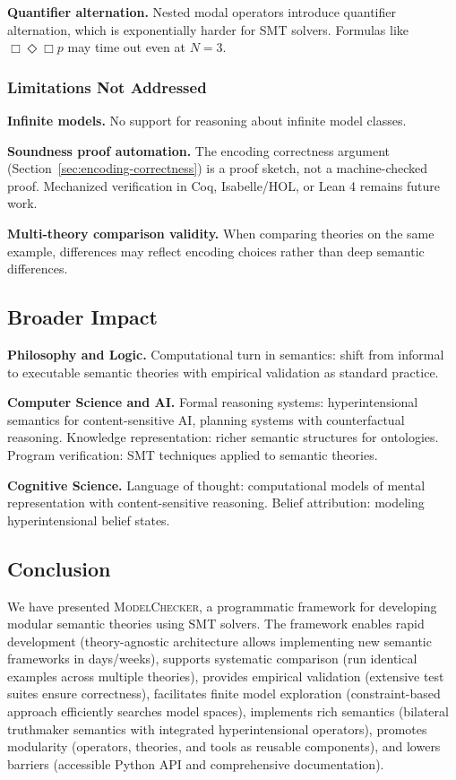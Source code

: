 \documentclass[pdflatex,sn-mathphys-num]{sn-jnl}
\newcommand{\nec}{\Box}                     %
\newcommand{\poss}{\Diamond}                %
\newcommand{\modelchecker}{\textsc{ModelChecker}}
\theoremstyle{thmstyleone}
\theoremstyle{thmstyletwo}
\theoremstyle{thmstylethree}
\begin{document}
\textbf{Quantifier alternation.}
Nested modal operators introduce quantifier alternation, which is exponentially harder for SMT solvers.
Formulas like $\nec\poss\nec p$ may time out even at $N=3$.

\subsubsection{Limitations Not Addressed}

\textbf{Infinite models.}
No support for reasoning about infinite model classes.

\textbf{Soundness proof automation.}
The encoding correctness argument (Section~\ref{sec:encoding-correctness}) is a proof sketch, not a machine-checked proof.
Mechanized verification in Coq, Isabelle/HOL, or Lean 4 remains future work.

\textbf{Multi-theory comparison validity.}
When comparing theories on the same example, differences may reflect encoding choices rather than deep semantic differences.

\subsection{Broader Impact}\label{sec:impact}

\textbf{Philosophy and Logic.}
Computational turn in semantics: shift from informal to executable semantic theories with empirical validation as standard practice.

\textbf{Computer Science and AI.}
Formal reasoning systems: hyperintensional semantics for content-sensitive AI, planning systems with counterfactual reasoning.
Knowledge representation: richer semantic structures for ontologies.
Program verification: SMT techniques applied to semantic theories.

\textbf{Cognitive Science.}
Language of thought: computational models of mental representation with content-sensitive reasoning.
Belief attribution: modeling hyperintensional belief states.

\subsection{Conclusion}\label{sec:conclusion}

We have presented \modelchecker{}, a programmatic framework for developing modular semantic theories using SMT solvers.
The framework enables rapid development (theory-agnostic architecture allows implementing new semantic frameworks in days/weeks), supports systematic comparison (run identical examples across multiple theories), provides empirical validation (extensive test suites ensure correctness), facilitates finite model exploration (constraint-based approach efficiently searches model spaces), implements rich semantics (bilateral truthmaker semantics with integrated hyperintensional operators), promotes modularity (operators, theories, and tools as reusable components), and lowers barriers (accessible Python API and comprehensive documentation).
\end{document}
